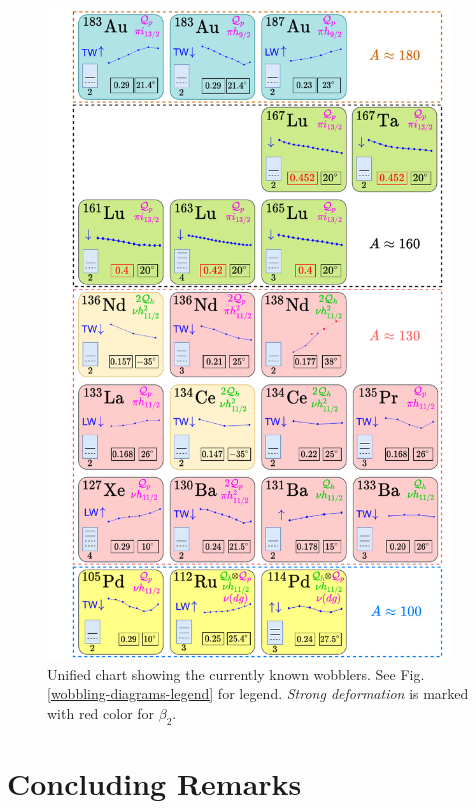 \begin{figure}
    \centering
    \includegraphics[width=0.96\textwidth]{Chapters/Figures/wobblers-chart.pdf}
    \caption{Unified chart showing the currently known wobblers. See Fig. \ref{wobbling-diagrams-legend} for legend. \emph{Strong deformation} is marked with red color for $\beta_2$.}
    \label{wobbling-diagram-chart}
\end{figure}

\section{Concluding Remarks}

